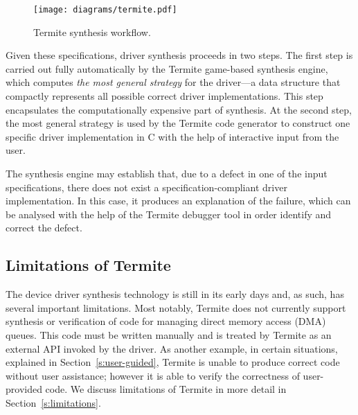 \documentclass{book}
\newcommand{\termite}{Termite\xspace}
\theoremstyle{definition}
\begin{document}
\begin{figure}
    \center
    \texttt{[image: diagrams/termite.pdf]}
    \caption{\termite synthesis workflow.}\label{f:termite}
\end{figure}

Given these specifications, driver synthesis proceeds in two steps.  The first step is carried out fully automatically by the \termite game-based synthesis engine, which computes \emph{the most general strategy} for the driver---a data structure that compactly represents all possible correct driver implementations.  This step encapsulates the computationally expensive part of synthesis.  At the second step, the most general strategy is used by the \termite code generator to construct one specific driver implementation in C with the help of interactive input from the user.

The synthesis engine may establish that, due to a defect in one of the input specifications, there does not exist a specification-compliant driver implementation.  In this case, it produces an explanation of the failure, which can be analysed with the help of the \termite debugger tool in order identify and correct the defect.

        
%
%        
%        

\subsection{Limitations of \termite}  The device driver synthesis technology is still in its early days and, as such, has several important limitations.  Most notably, \termite does not currently support synthesis or verification of code for managing direct memory access (DMA) queues.  This code must be written manually and is treated by \termite as an external API invoked by the driver.  As another example, in certain situations, explained in Section~\ref{s:user-guided}, \termite is unable to produce correct code without user assistance; however it is able to verify the correctness of user-provided code.  We discuss limitations of \termite in more detail in Section~\ref{s:limitations}.
\end{document}
